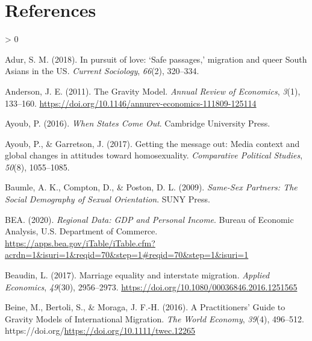 \documentclass[
  11pt,
]{article}
\newlength{\cslhangindent}
\newenvironment{CSLReferences}[2] %
 {%
  \setlength{\parindent}{0pt}
  \ifodd #1 \everypar{\setlength{\hangindent}{\cslhangindent}}\ignorespaces\fi
  \ifnum #2 > 0
  \setlength{\parskip}{#2\baselineskip}
  \fi
 }%
 {}
\begin{document}
\hypertarget{references}{%
\section{References}\label{references}}

\setlength{\parindent}{-0.2in}
\setlength{\leftskip}{0.2in}
\setlength{\parskip}{8pt}

\noindent

\hypertarget{refs}{}
\begin{CSLReferences}{1}{0}
\leavevmode\hypertarget{ref-adur_2018}{}%
Adur, S. M. (2018). In pursuit of love: {`{Safe} passages,'} migration and queer {South} {Asians} in the {US}. \emph{Current Sociology}, \emph{66}(2), 320--334.

\leavevmode\hypertarget{ref-anderson_2011}{}%
Anderson, J. E. (2011). The {Gravity} {Model}. \emph{Annual Review of Economics}, \emph{3}(1), 133--160. \url{https://doi.org/10.1146/annurev-economics-111809-125114}

\leavevmode\hypertarget{ref-ayoub_2016}{}%
Ayoub, P. (2016). \emph{When {States} {Come} {Out}}. Cambridge University Press.

\leavevmode\hypertarget{ref-ayoub_2017}{}%
Ayoub, P., \& Garretson, J. (2017). Getting the message out: {Media} context and global changes in attitudes toward homosexuality. \emph{Comparative Political Studies}, \emph{50}(8), 1055--1085.

\leavevmode\hypertarget{ref-baumle_2009}{}%
Baumle, A. K., Compton, D., \& Poston, D. L. (2009). \emph{Same-{Sex} {Partners}: {The} {Social} {Demography} of {Sexual} {Orientation}}. SUNY Press.

\leavevmode\hypertarget{ref-bea_2020}{}%
BEA. (2020). \emph{Regional {Data}: {GDP} and {Personal} {Income}}. Bureau of Economic Analysis, U.S. Department of Commerce. \url{https://apps.bea.gov/iTable/iTable.cfm?acrdn=1\&isuri=1\&reqid=70\&step=1\#reqid=70\&step=1\&isuri=1}

\leavevmode\hypertarget{ref-beaudin_2017}{}%
Beaudin, L. (2017). Marriage equality and interstate migration. \emph{Applied Economics}, \emph{49}(30), 2956--2973. \url{https://doi.org/10.1080/00036846.2016.1251565}

\leavevmode\hypertarget{ref-beine_2016}{}%
Beine, M., Bertoli, S., \& Moraga, J. F.-H. (2016). A {Practitioners}' {Guide} to {Gravity} {Models} of {International} {Migration}. \emph{The World Economy}, \emph{39}(4), 496--512. https://doi.org/\url{https://doi.org/10.1111/twec.12265}


\end{CSLReferences}
\end{document}
